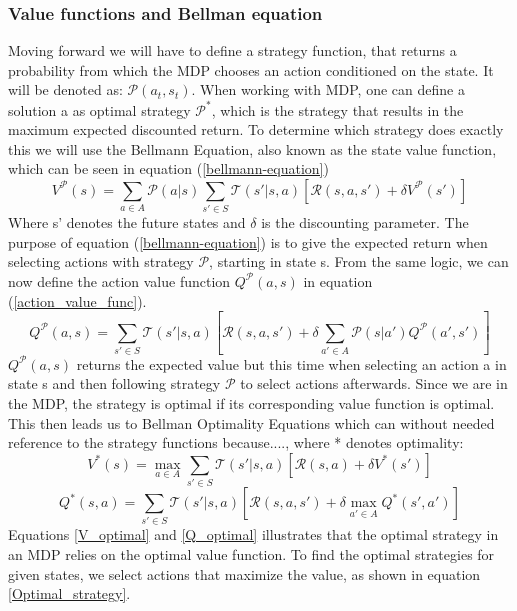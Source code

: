 \documentclass{article}
\begin{document}
\subsubsection{Value functions and Bellman equation}
Moving forward we will have to define a strategy function, that returns a probability from which the MDP chooses an action conditioned on the state. It will be denoted as: $\mathcal{P}(a_t,s_t)$. When working with MDP, one can define a solution a as optimal strategy $\mathcal{P}^*$, which is the strategy that results in the maximum expected discounted return. 
To determine which strategy does exactly this we will use the Bellmann Equation, also known as the state value function, which can be seen in equation (\ref{bellmann-equation})
\begin{equation}
    \label{bellmann-equation}
    V^{\mathcal{P}}(s)= \sum_{a\in A}\mathcal{P}(a|s)\sum_{s'\in S}\mathcal{T}(s'|s,a)[\mathcal{R}(s,a,s')+\delta V^{\mathcal{P}}(s')]
\end{equation}
Where s' denotes the future states and $\delta$ is the discounting parameter. 
The purpose of equation (\ref{bellmann-equation}) is to give the expected return when selecting actions with strategy $\mathcal{P}$, starting in state s. From the same logic, we can now define the action value function $Q^{\mathcal{P}}(a,s)$ in equation (\ref{action_value_func}).
\begin{equation}
    \label{action_value_func}
    Q^{\mathcal{P}}(a,s)=\sum_{s'\in S}\mathcal{T}(s'|s,a)[\mathcal{R}(s,a,s')+\delta\sum_{a'\in A}\mathcal{P}(s|a')Q^{\mathcal{P}}(a',s')]
\end{equation}
$Q^{\mathcal{P}}(a,s)$ returns the expected value but this time when  selecting an action a in state s and then following strategy $\mathcal{P}$ to select actions afterwards.
Since we are in the MDP, the strategy is optimal if its corresponding value function is optimal. This then leads us to Bellman Optimality Equations which can without needed reference to the strategy functions because...., where * denotes optimality:
\begin{equation}
    \label{V_optimal}
    V^*(s) = \max_{a\in A}\sum_{s'\in S}\mathcal{T}(s'|s,a)[\mathcal{R}(s,a)+\delta V^*(s')]
\end{equation}
\begin{equation}
    \label{Q_optimal}
    Q^*(s,a)= \sum_{s'\in S}\mathcal{T}(s'|s,a)[\mathcal{R}(s,a,s')+\delta \max_{a'\in A}Q^*(s',a')]
\end{equation}
Equations \ref{V_optimal} and \ref{Q_optimal} illustrates that the optimal strategy in an MDP relies on the optimal value function. To find the optimal strategies for given states, we select actions that maximize the value, as shown in equation \ref{Optimal_strategy}.
\end{document}
